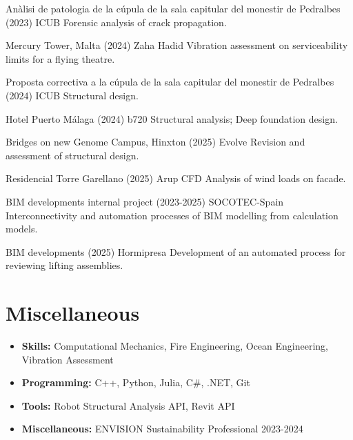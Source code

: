 \documentclass[12pt]{article}
\begin{document}
\parbox{\linewidth}{
    Anàlisi de patologia de la cúpula de la sala capitular del monestir de Pedralbes (2023) ICUB \newline
    Forensic analysis of crack propagation.}

\parbox{\linewidth}{
    Mercury Tower, Malta (2024) Zaha Hadid \newline
    Vibration assessment on serviceability limits for a flying theatre.}

\parbox{\linewidth}{
    Proposta correctiva a la cúpula de la sala capitular del monestir de Pedralbes (2024) ICUB \newline
    Structural design.}

\parbox{\linewidth}{
    Hotel Puerto Málaga (2024) b720 \newline
    Structural analysis;
    Deep foundation design.}

\parbox{\linewidth}{
    Bridges on new Genome Campus, Hinxton (2025) Evolve \newline
    Revision and assessment of structural design.}

\parbox{\linewidth}{
    Residencial Torre Garellano (2025) Arup \newline
    CFD Analysis of wind loads on facade.}

\parbox{\linewidth}{
    BIM developments internal project (2023-2025) SOCOTEC-Spain \newline
    Interconnectivity and automation processes of BIM modelling from calculation models.}

\parbox{\linewidth}{
    BIM developments (2025) Hormipresa \newline
    Development of an automated process for reviewing lifting assemblies.}


\section{Miscellaneous}
\begin{itemize}
    \itemsep=-.3em
    \item \textbf{Skills:} Computational Mechanics, Fire Engineering, Ocean Engineering, Vibration Assessment
    \item \textbf{Programming:} C++, Python, Julia, C\#, .NET, Git
    \item \textbf{Tools:} Robot Structural Analysis API, Revit API
    \item \textbf{Miscellaneous:} ENVISION Sustainability Professional 2023-2024
\end{itemize}
\end{document}

